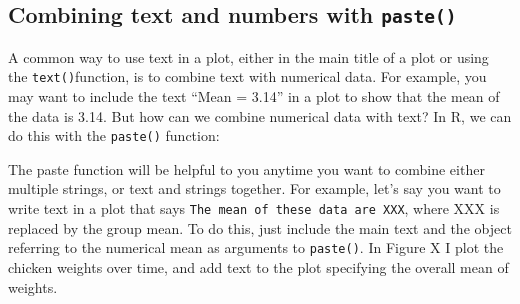 \documentclass[]{book}
\newenvironment{Shaded}{\begin{snugshade}}{\end{snugshade}}
\newcommand{\KeywordTok}[1]{\textcolor[rgb]{0.13,0.29,0.53}{\textbf{#1}}}
\newcommand{\DataTypeTok}[1]{\textcolor[rgb]{0.13,0.29,0.53}{#1}}
\newcommand{\DecValTok}[1]{\textcolor[rgb]{0.00,0.00,0.81}{#1}}
\newcommand{\StringTok}[1]{\textcolor[rgb]{0.31,0.60,0.02}{#1}}
\newcommand{\CommentTok}[1]{\textcolor[rgb]{0.56,0.35,0.01}{\textit{#1}}}
\newcommand{\OperatorTok}[1]{\textcolor[rgb]{0.81,0.36,0.00}{\textbf{#1}}}
\newcommand{\NormalTok}[1]{#1}
\theoremstyle{definition}
\theoremstyle{definition}
\theoremstyle{remark}
\begin{document}
\subsection{\texorpdfstring{Combining text and numbers with
\texttt{paste()}}{Combining text and numbers with paste()}}\label{combining-text-and-numbers-with-paste}

A common way to use text in a plot, either in the main title of a plot
or using the \texttt{text()}function, is to combine text with numerical
data. For example, you may want to include the text ``Mean = 3.14'' in a
plot to show that the mean of the data is 3.14. But how can we combine
numerical data with text? In R, we can do this with the \texttt{paste()}
function:

The paste function will be helpful to you anytime you want to combine
either multiple strings, or text and strings together. For example,
let's say you want to write text in a plot that says
\texttt{The\ mean\ of\ these\ data\ are\ XXX}, where XXX is replaced by
the group mean. To do this, just include the main text and the object
referring to the numerical mean as arguments to \texttt{paste()}. In
Figure X I plot the chicken weights over time, and add text to the plot
specifying the overall mean of weights.

\begin{Shaded}
\end{Shaded}
\end{document}
